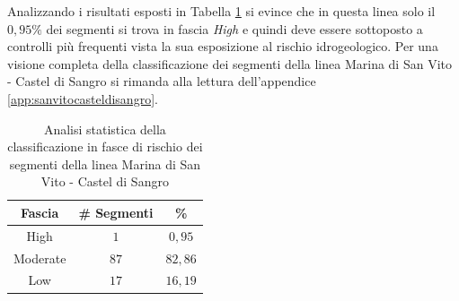 \newline
Analizzando i risultati esposti in Tabella \ref{percentualesanvitocasteldisangro} si evince che in questa linea solo il $0,95\%$ dei segmenti si trova in fascia \textit{High} e quindi deve essere sottoposto a controlli più frequenti vista la sua esposizione al rischio idrogeologico. 
Per una visione completa della classificazione dei segmenti della linea Marina di San Vito - Castel di Sangro si rimanda alla lettura dell'appendice \ref{app:sanvitocasteldisangro}.
\begin{table}[h]
\centering
\begin{tabular}{|c|c|c|}
\hline \rowcolor{lightgray}
Fascia   & \# Segmenti & \%    \\ \hline \rowcolor{flamingopink}
High     & $1$           & $0,95$     \\ \hline \rowcolor{icterine}
Moderate & $87$          & $82,86$ \\ \hline \rowcolor{inchworm}
Low      & $17$          & $16,19$ \\ \hline
\end{tabular}
\caption{Analisi statistica della classificazione in fasce di rischio dei segmenti della linea Marina di San Vito - Castel di Sangro}
\label{percentualesanvitocasteldisangro}
\end{table}
\newpage
